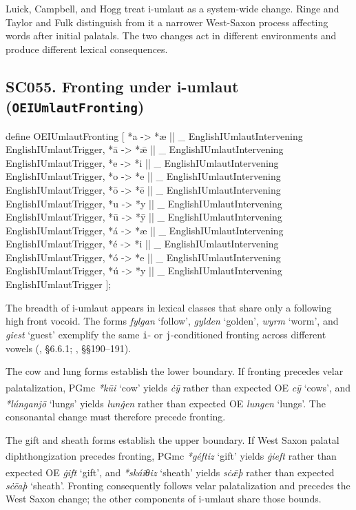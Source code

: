 \documentclass[
  british,
  a4paper,
  openany]{book}
\providecommand{\Pred}[1]{\textsuperscript{\dag}\emph{#1}}
\providecommand{\Recon}[1]{\emph{*#1}}
{\catcode`→=\active \global\def→{\ensuremath{\rightarrow}}}
\providecommand{\texorpdfstring}[2]{#1}
\providecommand{\Pred}[1]{\textsuperscript{\dag}\emph{#1}}
\providecommand{\Recon}[1]{\emph{*#1}}
{\catcode`→=\active \global\def→{\ensuremath{\rightarrow}}}
\begin{document}
Luick, Campbell, and Hogg treat i-umlaut as a system-wide change. Ringe
and Taylor and Fulk distinguish from it a narrower West-Saxon process
affecting words after initial palatals. The two changes act in different
environments and produce different lexical consequences.

\subsection{\texorpdfstring{SC055. Fronting under i-umlaut
(\texttt{OEIUmlautFronting})}{SC055. Fronting under i-umlaut (OEIUmlautFronting)}}\label{rule-OEIUmlautFronting}

\begin{ReaderFacingFoma}
define OEIUmlautFronting [
    {*a} -> {*æ} || _ EnglishIUmlautIntervening EnglishIUmlautTrigger,
    {*ā} -> {*ǣ} || _ EnglishIUmlautIntervening EnglishIUmlautTrigger,
    {*e} -> {*i} || _ EnglishIUmlautIntervening EnglishIUmlautTrigger,
    {*o} -> {*e} || _ EnglishIUmlautIntervening EnglishIUmlautTrigger,
    {*ō} -> {*ē} || _ EnglishIUmlautIntervening EnglishIUmlautTrigger,
    {*u} -> {*y} || _ EnglishIUmlautIntervening EnglishIUmlautTrigger,
    {*ū} -> {*ȳ} || _ EnglishIUmlautIntervening EnglishIUmlautTrigger,
    {*á} -> {*æ} || _ EnglishIUmlautIntervening EnglishIUmlautTrigger,
    {*é} -> {*i} || _ EnglishIUmlautIntervening EnglishIUmlautTrigger,
    {*ó} -> {*e} || _ EnglishIUmlautIntervening EnglishIUmlautTrigger,
    {*ú} -> {*y} || _ EnglishIUmlautIntervening EnglishIUmlautTrigger
];
\end{ReaderFacingFoma}

The breadth of i-umlaut appears in lexical classes that share only a
following high front vocoid. The forms \emph{fylgan} `follow',
\emph{gylden} `golden', \emph{wyrm} `worm', and \emph{giest} `guest'
exemplify the same \texttt{i}- or \texttt{j}-conditioned fronting across
different vowels (, §6.6.1; ,
§§190--191).

The cow and lung forms establish the lower boundary. If fronting
precedes velar palatalization, PGmc \Recon{kūi} `cow' yields \Pred{ċȳ}
rather than expected OE \emph{cȳ} `cows', and \Recon{lúnganjō} `lungs'
yields \Pred{lunġen} rather than expected OE \emph{lungen} `lungs'. The
consonantal change must therefore precede fronting.

The gift and sheath forms establish the upper boundary. If West Saxon
palatal diphthongization precedes fronting, PGmc \Recon{géftiz} `gift'
yields \Pred{ġieft} rather than expected OE \emph{ġift} `gift', and
\Recon{skáiθiz} `sheath' yields \Pred{sċǣþ} rather than expected
\emph{sċēaþ} `sheath'. Fronting consequently follows velar
palatalization and precedes the West Saxon change; the other components
of i-umlaut share those bounds.
\end{document}
